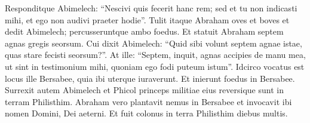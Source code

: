 \begin{biblechapter}
\verse Responditque Abimelech: “Nescivi quis fecerit hanc rem; sed et tu non indicasti mihi, et ego non audivi praeter hodie”. 
\verse Tulit itaque Abraham oves et boves et dedit Abimelech; percusseruntque ambo foedus. 
\verse Et statuit Abraham septem agnas gregis seorsum. 
\verse Cui dixit Abimelech: “Quid sibi volunt septem agnae istae, quas stare fecisti seorsum?”. 
\verse At ille: “Septem, inquit, agnas accipies de manu mea, ut sint in testimonium mihi, quoniam ego fodi puteum istum”. 
\verse Idcirco vocatus est locus ille Bersabee, quia ibi uterque iuraverunt. 
\verse Et inierunt foedus in Bersabee. 
\verse Surrexit autem Abimelech et Phicol princeps militiae eius reversique sunt in terram Philisthim. Abraham vero plantavit nemus in Bersabee et invocavit ibi nomen Domini, Dei aeterni. 
\verse Et fuit colonus in terra Philisthim diebus multis. 
\end{biblechapter}

